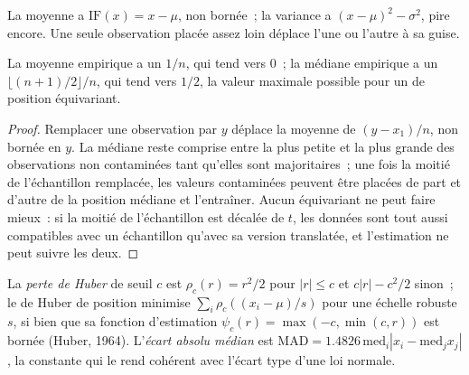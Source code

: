 La moyenne a $\mathrm{IF}(x) = x - \mu$, non bornée~; la variance a $(x - \mu)^2 - \sigma^2$, pire encore. Une seule observation placée assez loin
déplace l'une ou l'autre à sa guise.

\begin{proposition}\label{prop:qm:robust-statistics-and-heavy-tails:breakdown}
La moyenne empirique a un  $1/n$, qui tend vers 0~; la médiane empirique a un  $\lfloor(n + 1)/2\rfloor/n$, qui
tend vers $1/2$, la valeur maximale possible pour un  de position équivariant.
\end{proposition}

\begin{proof}
Remplacer une observation par $y$ déplace la moyenne de $(y - x_1)/n$, non bornée en $y$. La médiane reste comprise entre la plus petite et la plus grande des
observations non contaminées tant qu'elles sont majoritaires~; une fois la moitié de l'échantillon remplacée, les valeurs contaminées peuvent être placées
de part et d'autre de la position médiane et l'entraîner. Aucun  équivariant ne peut faire mieux~: si la moitié de l'échantillon est décalée de $t$, les données
sont tout aussi compatibles avec un échantillon qu'avec sa version translatée, et l'estimation ne peut suivre les deux.
\end{proof}

\begin{definition}\label{def:qm:robust-statistics-and-heavy-tails:huber}
La \emph{perte de Huber} de seuil $c$ est $\rho_c(r) = r^2/2$ pour $|r| \le c$ et $c|r| - c^2/2$ sinon~; le 
de Huber de position minimise $\sum_i\rho_c((x_i - \mu)/s)$ pour une échelle robuste $s$, si bien que sa fonction d'estimation $\psi_c(r) = \max(-c,
\min(c, r))$ est bornée (Huber, 1964). L'\emph{écart absolu médian} est $\mathrm{MAD} =
1.4826\,\mathrm{med}_i|x_i - \mathrm{med}_jx_j|$, la constante qui le rend cohérent avec l'écart type d'une loi normale.
\end{definition}

